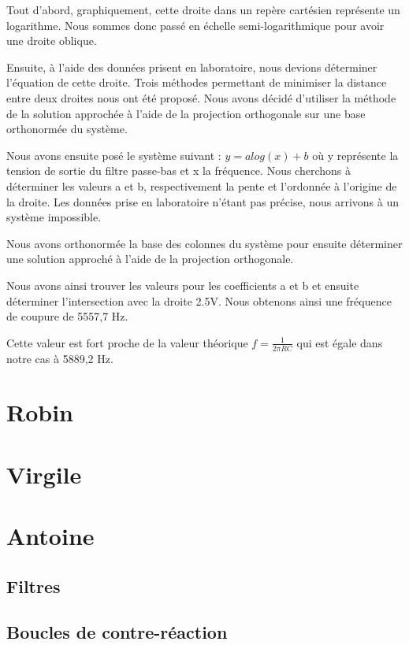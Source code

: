 \documentclass{article}
\begin{document}
Tout d'abord, graphiquement, cette droite dans un repère cartésien représente un logarithme. Nous sommes donc passé en échelle semi-logarithmique pour avoir une droite oblique.

Ensuite, à l'aide des données prisent en laboratoire, nous devions déterminer l'équation de cette droite. Trois méthodes permettant de minimiser la distance entre deux droites nous ont été proposé. Nous avons décidé d'utiliser
la méthode de la solution approchée à l'aide de la projection orthogonale sur une base orthonormée du système. 

Nous avons ensuite posé le système suivant : $y = a log(x) + b$ où y représente la tension de sortie du filtre passe-bas et x la fréquence. Nous cherchons à déterminer les valeurs a et b, 
respectivement la pente et l'ordonnée à l'origine de la droite. Les données prise en laboratoire n'étant pas précise, nous arrivons à un système impossible. 

Nous avons orthonormée la base des colonnes du système pour ensuite  déterminer une solution approché à l'aide de la projection orthogonale. 

Nous avons ainsi trouver les valeurs pour les coefficients a et b et ensuite déterminer l'intersection avec la droite 2.5V.
Nous obtenons ainsi une fréquence de coupure de 5557,7 Hz. 

Cette valeur est fort proche de la valeur théorique $f = \frac{1}{2\pi RC}$ qui est égale dans notre cas à 5889,2 Hz.

\section{Robin}

\section{Virgile}

\section{Antoine}
\subsection{Filtres}

\subsection{Boucles de contre-réaction}
\end{document}
